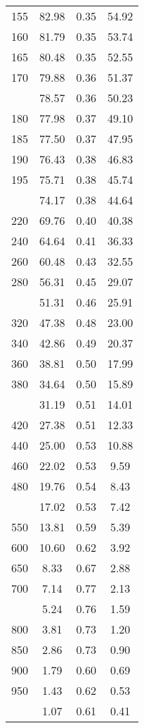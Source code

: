 \begin{table}[ht]
\begin{tabular}{lccc}
  155 & 82.98 & 0.35 & 54.92 \\ 
  160 & 81.79 & 0.35 & 53.74 \\ 
  165 & 80.48 & 0.35 & 52.55 \\ 
  170 & 79.88 & 0.36 & 51.37 \\ 
   \addlinespace
175 & 78.57 & 0.36 & 50.23 \\ 
  180 & 77.98 & 0.37 & 49.10 \\ 
  185 & 77.50 & 0.37 & 47.95 \\ 
  190 & 76.43 & 0.38 & 46.83 \\ 
  195 & 75.71 & 0.38 & 45.74 \\ 
   \addlinespace
200 & 74.17 & 0.38 & 44.64 \\ 
  220 & 69.76 & 0.40 & 40.38 \\ 
  240 & 64.64 & 0.41 & 36.33 \\ 
  260 & 60.48 & 0.43 & 32.55 \\ 
  280 & 56.31 & 0.45 & 29.07 \\ 
   \addlinespace
300 & 51.31 & 0.46 & 25.91 \\ 
  320 & 47.38 & 0.48 & 23.00 \\ 
  340 & 42.86 & 0.49 & 20.37 \\ 
  360 & 38.81 & 0.50 & 17.99 \\ 
  380 & 34.64 & 0.50 & 15.89 \\ 
   \addlinespace
400 & 31.19 & 0.51 & 14.01 \\ 
  420 & 27.38 & 0.51 & 12.33 \\ 
  440 & 25.00 & 0.53 & 10.88 \\ 
  460 & 22.02 & 0.53 & 9.59 \\ 
  480 & 19.76 & 0.54 & 8.43 \\ 
   \addlinespace
500 & 17.02 & 0.53 & 7.42 \\ 
  550 & 13.81 & 0.59 & 5.39 \\ 
  600 & 10.60 & 0.62 & 3.92 \\ 
  650 & 8.33 & 0.67 & 2.88 \\ 
  700 & 7.14 & 0.77 & 2.13 \\ 
   \addlinespace
750 & 5.24 & 0.76 & 1.59 \\ 
  800 & 3.81 & 0.73 & 1.20 \\ 
  850 & 2.86 & 0.73 & 0.90 \\ 
  900 & 1.79 & 0.60 & 0.69 \\ 
  950 & 1.43 & 0.62 & 0.53 \\ 
   \addlinespace
1000 & 1.07 & 0.61 & 0.41 \\ 
   \bottomrule
\end{tabular}
\end{table}
